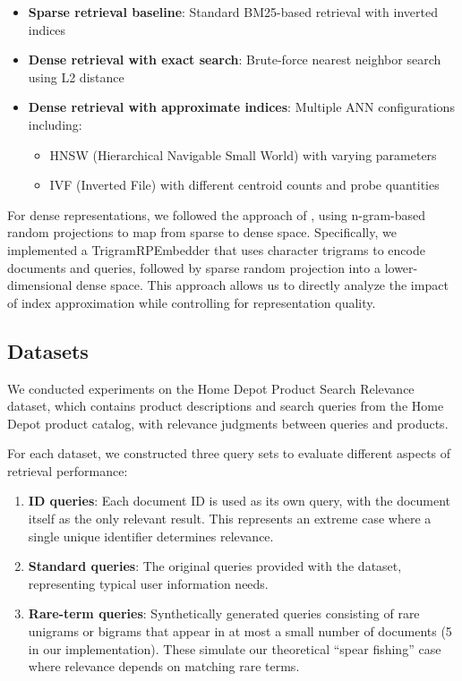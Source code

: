 \documentclass[sigconf,review]{acmart}
\begin{document}
\begin{itemize}
    \item \textbf{Sparse retrieval baseline}: Standard BM25-based retrieval with inverted indices
    \item \textbf{Dense retrieval with exact search}: Brute-force nearest neighbor search using L2 distance
    \item \textbf{Dense retrieval with approximate indices}: Multiple ANN configurations including:
    \begin{itemize}
        \item HNSW (Hierarchical Navigable Small World) with varying parameters
        \item IVF (Inverted File) with different centroid counts and probe quantities
    \end{itemize}
\end{itemize}

For dense representations, we followed the approach of \citet{tay2020sparse}, using n-gram-based random projections to map from sparse to dense space. Specifically, we implemented a TrigramRPEmbedder that uses character trigrams to encode documents and queries, followed by sparse random projection into a lower-dimensional dense space. This approach allows us to directly analyze the impact of index approximation while controlling for representation quality.

\subsection{Datasets}
We conducted experiments on the Home Depot Product Search Relevance dataset, which contains product descriptions and search queries from the Home Depot product catalog, with relevance judgments between queries and products.

For each dataset, we constructed three query sets to evaluate different aspects of retrieval performance:

\begin{enumerate}
    \item \textbf{ID queries}: Each document ID is used as its own query, with the document itself as the only relevant result. This represents an extreme case where a single unique identifier determines relevance.
    \item \textbf{Standard queries}: The original queries provided with the dataset, representing typical user information needs.
    \item \textbf{Rare-term queries}: Synthetically generated queries consisting of rare unigrams or bigrams that appear in at most a small number of documents (5 in our implementation). These simulate our theoretical ``spear fishing'' case where relevance depends on matching rare terms.
\end{enumerate}
\end{document}
